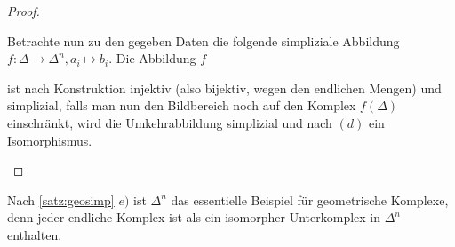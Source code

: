 \begin{Satz}
\begin{proof}
\begin{enumerate}[(a)]
            Betrachte nun zu den gegeben Daten die folgende
            simpliziale Abbildung
            $f : \Delta \rightarrow \Delta^n , a_i \mapsto b_i$.  Die
            Abbildung $f$ 

            ist nach Konstruktion injektiv (also
            bijektiv, wegen den endlichen Mengen) und simplizial,
            falls man nun den Bildbereich noch auf den Komplex
            $f(\Delta)$ einschränkt, wird die Umkehrabbildung
            simplizial und nach $(d)$ ein Isomorphismus.
          \end{enumerate}
	\end{proof}
\end{Satz}

\begin{Bem}
  Nach \cref{satz:geosimp} $e)$ ist $\Delta^n$ das essentielle
  Beispiel für geometrische Komplexe, denn jeder endliche Komplex ist
  als ein isomorpher Unterkomplex in $\Delta^n$ enthalten.
\end{Bem}














